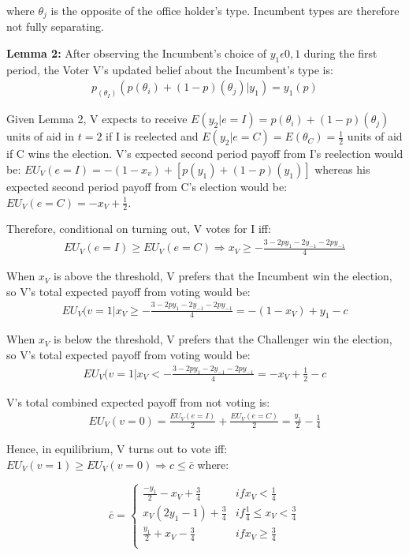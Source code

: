 \documentclass[12pt]{paper}
\begin{document}
where $\theta_j$ is the opposite of the office holder’s type. Incumbent types are therefore not fully separating.

\textbf{Lemma 2:}  After observing the Incumbent’s choice of $y_1 \epsilon {0,1}$ during the first period, the Voter V’s updated belief about the Incumbent’s type is: 
\begin{gather}
p_{(\theta_I)}(p(\theta_i ) + (1 - p)(\theta_j ) | y_1 )=y_1(p)
\end{gather}

Given Lemma 2, V expects to receive $E(y_2 | e=I) = p(\theta_i )+(1-p)(\theta_j)$ units of aid in $t=2$ if I is reelected and $E(y_2 |e=C)=E(\theta_C )=\frac{1}{2}$ units of aid if C wins the election.  V’s expected second period payoff from I’s reelection would be: $EU_V (e=I) = -(1 - x_v ) + [p(y_1 ) + (1 - p)(y_1 )]$ whereas his expected second period payoff from C’s election would be: $EU_V (e=C) = - x_V + \frac{1}{2}$. 

Therefore, conditional on turning out, V votes for I iff: 
\begin{gather}
EU_V (e=I) \geq EU_V (e=C) \Rightarrow
x_V \geq -\frac{3 - 2py_1 - 2y_{-1} - 2py_{-1}}{4}
\end{gather}

When $x_V$ is above the threshold, V prefers that the Incumbent win the election, so V’s total expected payoff from voting would be:
\begin{gather}
EU_V (v=1 | x_V \geq -\frac{3 - 2py_1 - 2y_{-1} - 2py_{-1}}{4} =
- (1 - x_V ) + y_1 - c
\end{gather}

When $x_V$ is below the threshold, V prefers that the Challenger win the election, so V’s total expected payoff from voting would be:
\begin{gather}
EU_V (v=1 | x_V < -\frac{3 - 2py_1 - 2y_{-1} - 2py_{-1}}{4} = 
-x_V + \frac{1}{2} - c
\end{gather}

V’s total combined expected payoff from not voting is:
\begin{gather}
EU_V (v=0) = \frac{EU_V (e=I)}{2} + \frac{EU_V (e=C)}{2} = 
\frac{y_1}{2} - \frac{1}{4}
\end{gather}

Hence, in equilibrium, V turns out to vote iff: $EU_V (v=1) \geq EU_V (v=0) \Rightarrow c \leq \bar{c}$ where:

\begin{equation}
\bar{c} =
\begin{cases}
\frac{-y_1}{2} - x_V + \frac{3}{4} & if x_V < \frac{1}{4} \\
x_V (2y_1 - 1) + \frac{3}{4}     & if \frac{1}{4} \leq x_V < \frac{3}{4}  \\
\frac{y_1}{2} + x_V - \frac{3}{4}     & if x_V \geq \frac{3}{4}  \\
\end{cases}
\end{equation}
\end{document}
